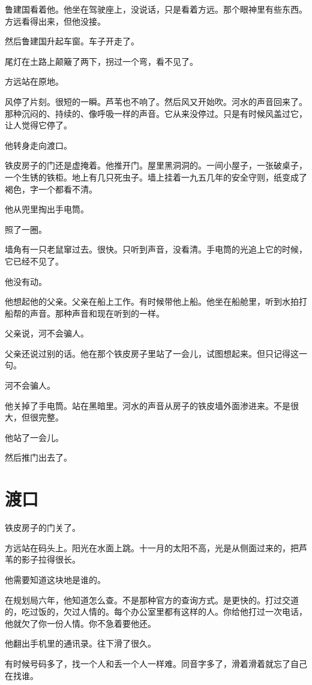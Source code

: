 \documentclass[UTF8,a5paper,11pt,openany]{ctexbook}
\begin{document}
鲁建国看着他。他坐在驾驶座上，没说话，只是看着方远。那个眼神里有些东西。方远看得出来，但他没接。

然后鲁建国升起车窗。车子开走了。

尾灯在土路上颠簸了两下，拐过一个弯，看不见了。

方远站在原地。

风停了片刻。很短的一瞬。芦苇也不响了。然后风又开始吹。河水的声音回来了。那种沉闷的、持续的、像呼吸一样的声音。它从来没停过。只是有时候风盖过它，让人觉得它停了。

他转身走向渡口。

铁皮房子的门还是虚掩着。他推开门。屋里黑洞洞的。一间小屋子，一张破桌子，一个生锈的铁柜。地上有几只死虫子。墙上挂着一九五几年的安全守则，纸变成了褐色，字一个都看不清。

他从兜里掏出手电筒。

照了一圈。

墙角有一只老鼠窜过去。很快。只听到声音，没看清。手电筒的光追上它的时候，它已经不见了。

他没有动。

他想起他的父亲。父亲在船上工作。有时候带他上船。他坐在船舱里，听到水拍打船帮的声音。那种声音和现在听到的一样。

父亲说，河不会骗人。

父亲还说过别的话。他在那个铁皮房子里站了一会儿，试图想起来。但只记得这一句。

河不会骗人。

他关掉了手电筒。站在黑暗里。河水的声音从房子的铁皮墙外面渗进来。不是很大，但很完整。

他站了一会儿。

然后推门出去了。

\clearpage

\chapter{渡口}
\indent
铁皮房子的门关了。

方远站在码头上。阳光在水面上跳。十一月的太阳不高，光是从侧面过来的，把芦苇的影子拉得很长。

他需要知道这块地是谁的。

在规划局六年，他知道怎么查。不是那种官方的查询方式。是更快的。打过交道的，吃过饭的，欠过人情的。每个办公室里都有这样的人。你给他打过一次电话，他就欠了你一份人情。你不急着要他还。

他翻出手机里的通讯录。往下滑了很久。

有时候号码多了，找一个人和丢一个人一样难。同音字多了，滑着滑着就忘了自己在找谁。
\end{document}

